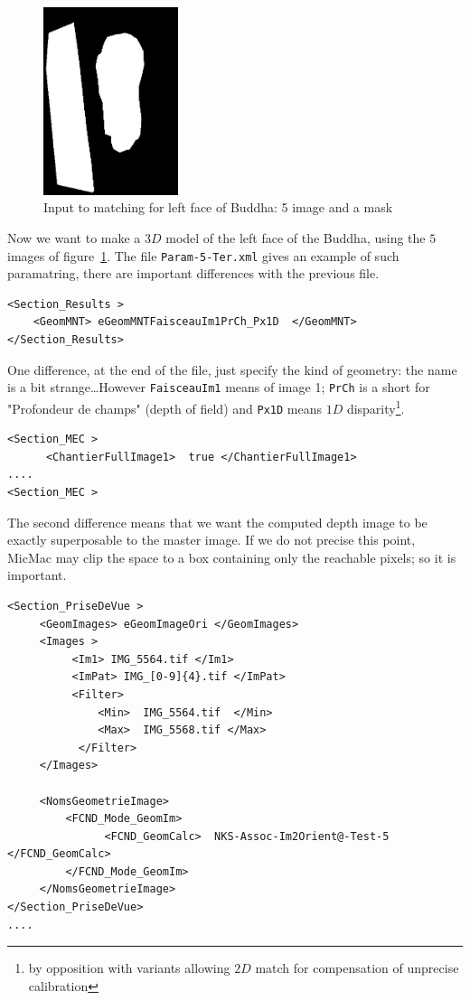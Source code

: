 \begin{figure}
\begin{center}
\includegraphics[height=55mm]{FIGS/Boudhas/IMG_5564_Masq.jpg}
\caption{Input to matching for left face of Buddha: 5 image and a mask}
\label{BOUDHA:GRIM:INPUT}
\end{center}
\end{figure}

Now we want to make a $3D$ model of the left face of the Buddha, using
the $5$ images of figure~\ref{BOUDHA:GRIM:INPUT}. The file {\tt Param-5-Ter.xml}
gives an example of such paramatring, there are important differences with the previous file.

{\scriptsize
\begin{verbatim}
<Section_Results >
    <GeomMNT> eGeomMNTFaisceauIm1PrCh_Px1D  </GeomMNT>
</Section_Results>
\end{verbatim}
}

One difference, at the end of the file, just specify the kind of geometry:
the name is a bit strange\dots However {\tt FaisceauIm1} means  of image 1;
{\tt PrCh} is a short for "Profondeur de champs" (depth of field) and {\tt Px1D}
means $1D$ disparity\footnote{by opposition with variants allowing $2D$ match for
compensation of unprecise calibration}.


{\scriptsize
\begin{verbatim}
<Section_MEC >
      <ChantierFullImage1>  true </ChantierFullImage1>
....
<Section_MEC >
\end{verbatim}
}

The second difference means that we
want the computed depth image to be exactly superposable to the master image.
If we do not precise this point, MicMac may clip the space to a box containing
only the reachable pixels; so it is important.


{\scriptsize
\begin{verbatim}
<Section_PriseDeVue >
     <GeomImages> eGeomImageOri </GeomImages>
     <Images >
          <Im1> IMG_5564.tif </Im1>
          <ImPat> IMG_[0-9]{4}.tif </ImPat>
          <Filter>
              <Min>  IMG_5564.tif  </Min>
              <Max>  IMG_5568.tif </Max>
           </Filter>
     </Images>

     <NomsGeometrieImage>
         <FCND_Mode_GeomIm>
               <FCND_GeomCalc>  NKS-Assoc-Im2Orient@-Test-5  </FCND_GeomCalc>
         </FCND_Mode_GeomIm>
     </NomsGeometrieImage>
</Section_PriseDeVue>
....
\end{verbatim}
}

